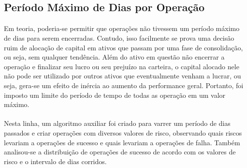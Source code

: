 \FloatBarrier
\subsection{Período Máximo de Dias por Operação}
\label{sub:max_op_days}

\paragraph{} Em teoria, poderia-se permitir que operações não tivessem um período máximo de dias para serem encerradas. Contudo, isso facilmente se prova uma decisão ruim de alocação de capital em ativos que passam por uma fase de consolidação, ou seja, sem qualquer tendência. Além do ativo em questão não encerrar a operação e finalizar seu lucro ou seu prejuízo na carteira, o capital alocado nele não pode ser utilizado por outros ativos que eventualmente venham a lucrar, ou seja, gera-se um efeito de inércia ao aumento da performance geral. Portanto, foi imposto um limite do período de tempo de todas as operação em um valor máximo.



\paragraph{} Nesta linha, um algoritmo auxiliar foi criado para varrer um período de dias passados e criar operações com diversos valores de risco, observando quais riscos levariam a operações de sucesso e quais levariam a operações de falha. Também analisou-se a distribuição de operações de sucesso de acordo com os valores de risco e o intervalo de dias corridos.


